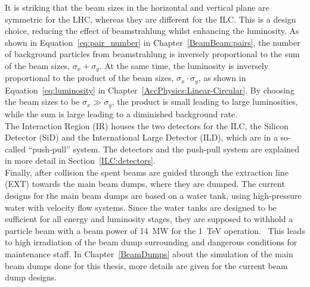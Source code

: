 It is striking that the beam sizes in the horizontal and vertical plane are symmetric for the LHC, whereas they are different for the ILC.
This is a design choice, reducing the effect of beamstrahlung whilst enhancing the luminosity.
As shown in Equation~\ref{eq:pair_number} in Chapter~\ref{BeamBeam:pairs}, the number of background particles from beamstrahlung is inversely proportional to the sum of the beam sizes, $\sigma_x+\sigma_y$.
At the same time, the luminosity is inversely proportional to the product of the beam sizes, $\sigma_x\cdot\sigma_y$, as shown in Equation~\ref{eq:luminosity} in Chapter~\ref{AccPhysics:Linear-Circular}.
By choosing the beam sizes to be $\sigma_x\gg\sigma_y$, the product is small leading to large luminosities, while the sum is large leading to a diminished background rate.\\
The Interaction Region (IR) houses the two detectors for the ILC, the Silicon Detector (SiD) and the International Large Detector (ILD), which are in a so-called ``push-pull'' system.
The detectors and the push-pull system are explained in more detail in Section~\ref{ILC:detectors}.\\
Finally, after collision the spent beams are guided through the extraction line (EXT) towards the main beam dumps, where they are dumped.
The current designs for the main beam dumps are based on a water tank, using high-pressure water with velocity flow systems.
Since the water tanks are designed to be sufficient for all energy and luminosity stages, they are supposed to withhold a particle beam with a beam power of \SI{14}{\mega\watt} for the \SI{1}{\TeV} operation.~\cite[p. 18]{TDR32}
This leads to high irradiation of the beam dump surrounding and dangerous conditions for maintenance staff.
In Chapter~\ref{BeamDumps} about the simulation of the main beam dumps done for this thesis, more details are given for the current beam dump designs.


